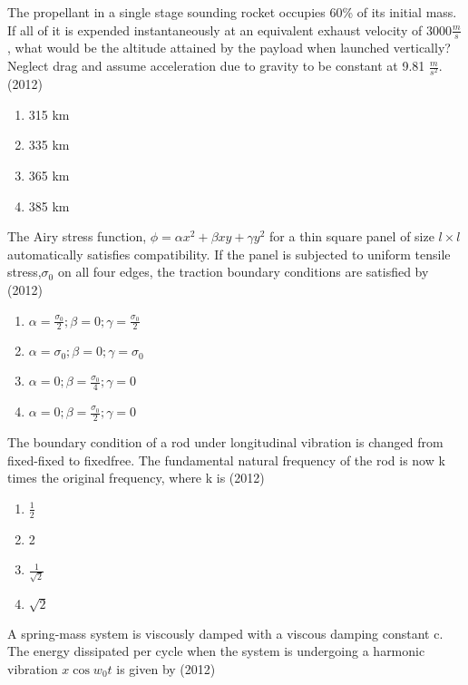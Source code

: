     \item The propellant in a single stage sounding rocket occupies 60\% of its initial mass. If all of it is
    expended instantaneously at an equivalent exhaust velocity of $3000\frac{m}{s}$, what would be the altitude
    attained by the payload when launched vertically?\\
    Neglect drag and assume acceleration due to gravity to be constant at 9.81 $\frac{m}{s^2}$. \hfill (2012)
    \begin{enumerate}[label=(\Alph*)]
        \item 315 km
        \item 335 km
        \item 365 km
        \item 385 km
    \end{enumerate}
    \item The Airy stress function, $\phi = \alpha x^2 + \beta xy + \gamma y^2$ for a thin square panel of size $l\times l$ automatically
    satisfies compatibility. If the panel is subjected to uniform tensile stress,$\sigma _0$ on all four edges, the
    traction boundary conditions are satisfied by \hfill (2012)
    \begin{enumerate}[label=(\Alph*)]
        \item $\alpha = \frac{\sigma_0}{2};\beta = 0;\gamma = \frac{\sigma_0}{2}$
        \item $\alpha = \sigma_0;\beta = 0;\gamma = \sigma_0$
        \item $\alpha = 0;\beta = \frac{\sigma_0}{4};\gamma = 0$
        \item $\alpha = 0;\beta = \frac{\sigma_0}{2};\gamma = 0$
    \end{enumerate}
    \item The boundary condition of a rod under longitudinal vibration is changed from fixed-fixed to fixedfree. The fundamental natural frequency of the rod is now k times the original frequency, where k is \hfill (2012)
    \begin{enumerate}[label=(\Alph*)]
        \item $\frac{1}{2}$
        \item 2
        \item $\frac{1}{\sqrt{2}}$
        \item $\sqrt{2}$
    \end{enumerate}
    \item A spring-mass system is viscously damped with a viscous damping constant c. The energy
    dissipated per cycle when the system is undergoing a harmonic vibration $x\cos w_0t$ is given by \hfill (2012)
